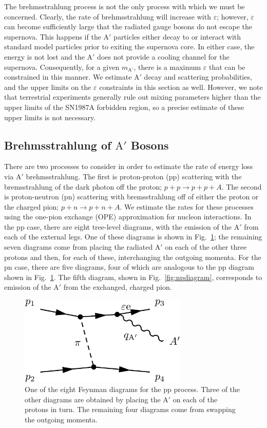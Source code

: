 \documentclass[nofootinbib,prd,superscriptaddress,twocolumn]{revtex4}
\newcommand{\Aprime}{\mathrm{A}'}
\begin{document}
The brehmsstrahlung process is not the only process with which we must be concerned. Clearly, the rate of 
brehmsstrahlung will increase with $\varepsilon$; however, $\varepsilon$ can become sufficiently large 
that the radiated gauge bosons do not escape the supernova. This happens if the $\Aprime$ particles 
either decay to or interact with standard model particles prior to exiting the supernova core. 
In either case, the energy is not lost and the $\Aprime$ does not provide a cooling channel for the supernova. 
Consequently, for a given $m_{\Aprime}$, there is a maximum $\varepsilon$ that can be constrained in this 
manner. We estimate $\Aprime$ decay and scattering probabilities, and the upper limits on the $\varepsilon$ 
constraints in this section as well. However, we note that terrestrial experiments generally rule out 
mixing parameters higher than the upper limits of the SN1987A forbidden region, so a precise estimate 
of these upper limits is not necessary.

\subsection{Brehmsstrahlung of $\Aprime$ Bosons}


There are two processes to consider in order to estimate the rate of energy loss via $\Aprime$ brehmsstrahlung. The first is  
proton-proton (pp) scattering with the bremsstrahlung of the dark photon off the proton; $p+p \rightarrow p+p+A$. The 
second is proton-neutron (pn) scattering with bremsstrahlung off of either the proton or the charged pion; 
$p+n \rightarrow p+n+A$. We estimate the rates for these processes using the one-pion exchange (OPE) 
approximation for nucleon interactions. In the pp case, there are eight tree-level diagrams, 
with the emission of the $\Aprime$ from each of the external legs. One of these diagrams is shown 
in Fig.~\ref{fig:ppdiagram}; the remaining seven diagrams come from placing the radiated $\Aprime$ 
on each of the other three protons and then, for each of these, interchanging the outgoing momenta. 
For the pn case, there are five diagrams, four of which are analogous to the pp diagram shown in 
Fig.~\ref{fig:ppdiagram}. The fifth diagram, shown in Fig.~\ref{fig:npdiagram}, corresponds to 
emission of the $\Aprime$ from the exchanged, charged pion.

\begin{figure}
\includegraphics[width=8cm]{ppdiagram.pdf}
\caption{One of the eight Feynman diagrams for the pp process. Three of the other diagrams are obtained by 
placing the $\Aprime$ on each of the protons in turn. The remaining four diagrams come from swapping the outgoing 
momenta.}
\label{fig:ppdiagram}
\end{figure}
	
\end{document}
